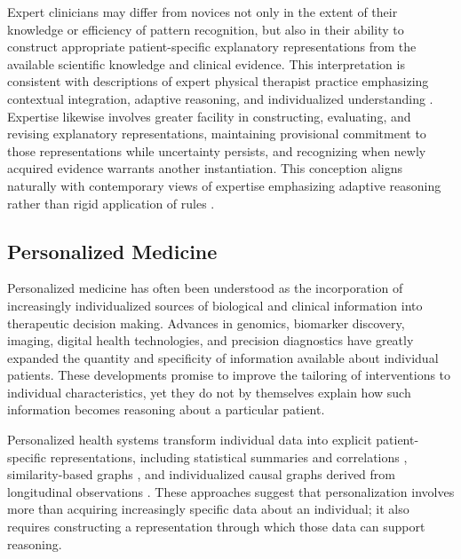 \documentclass[11pt]{article}
\begin{document}
Expert clinicians may differ from novices not only in the extent of their knowledge or efficiency of pattern recognition, but also in their ability to construct appropriate patient-specific explanatory representations from the available scientific knowledge and clinical evidence. This interpretation is consistent with descriptions of expert physical therapist practice emphasizing contextual integration, adaptive reasoning, and individualized understanding \parencite{jensen_expertise_2007}. Expertise likewise involves greater facility in constructing, evaluating, and revising explanatory representations, maintaining provisional commitment to those representations while uncertainty persists, and recognizing when newly acquired evidence warrants another instantiation. This conception aligns naturally with contemporary views of expertise emphasizing adaptive reasoning rather than rigid application of rules \parencite{schmidt_cognitive_1990,norman_research_2005}.

\subsection{Personalized Medicine}

Personalized medicine has often been understood as the incorporation of increasingly individualized sources of biological and clinical information into therapeutic decision making. Advances in genomics, biomarker discovery, imaging, digital health technologies, and precision diagnostics have greatly expanded the quantity and specificity of information available about individual patients. These developments promise to improve the tailoring of interventions to individual characteristics, yet they do not by themselves explain how such information becomes reasoning about a particular patient.

Personalized health systems transform individual data into explicit patient-specific representations, including statistical summaries and correlations \parencite{fang_physiollm_2024}, similarity-based graphs \parencite{subramanian_graph-augmented_2024}, and individualized causal graphs derived from longitudinal observations \parencite{yang_chatdiet_2024,yang_personalized_2025}. These approaches suggest that personalization involves more than acquiring increasingly specific data about an individual; it also requires constructing a representation through which those data can support reasoning.
\end{document}
